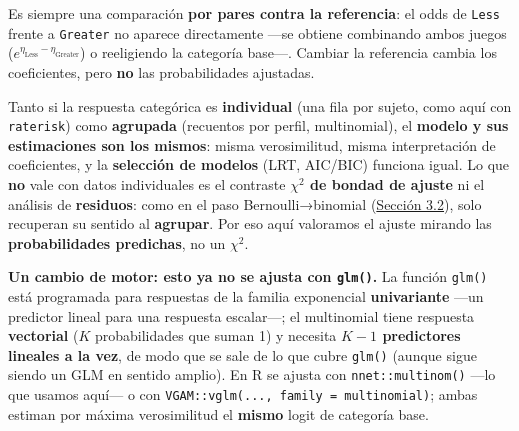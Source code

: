 \documentclass[
  letterpaper,
  DIV=11,
  numbers=noendperiod]{scrartcl}
\begin{document}
Es siempre una comparación \textbf{por pares contra la referencia}: el
odds de \texttt{Less} frente a \texttt{Greater} no aparece directamente
---se obtiene combinando ambos juegos
(\(e^{\eta_{\text{Less}}-\eta_{\text{Greater}}}\)) o reeligiendo la
categoría base---. Cambiar la referencia cambia los coeficientes, pero
\textbf{no} las probabilidades ajustadas.

\begin{tcolorbox}[enhanced jigsaw, breakable, colframe=quarto-callout-note-color-frame, left=2mm, arc=.35mm, colbacktitle=quarto-callout-note-color!10!white, toprule=.15mm, colback=white, coltitle=black, rightrule=.15mm, opacitybacktitle=0.6, title=\textcolor{quarto-callout-note-color}{\faInfo}\hspace{0.5em}{Individual o agrupado: qué cambia y qué no}, titlerule=0mm, toptitle=1mm, bottomtitle=1mm, leftrule=.75mm, bottomrule=.15mm, opacityback=0]

Tanto si la respuesta categórica es \textbf{individual} (una fila por
sujeto, como aquí con \texttt{raterisk}) como \textbf{agrupada}
(recuentos por perfil, multinomial), el \textbf{modelo y sus
estimaciones son los mismos}: misma verosimilitud, misma interpretación
de coeficientes, y la \textbf{selección de modelos} (LRT, AIC/BIC)
funciona igual. Lo que \textbf{no} vale con datos individuales es el
contraste \textbf{\(\chi^2\) de bondad de ajuste} ni el análisis de
\textbf{residuos}: como en el paso Bernoulli→binomial
(\protect\hyperlink{sec-u13-gof-binomial}{Sección 3.2}), solo recuperan
su sentido al \textbf{agrupar}. Por eso aquí valoramos el ajuste mirando
las \textbf{probabilidades predichas}, no un \(\chi^2\).

\end{tcolorbox}

\textbf{Un cambio de motor: esto ya no se ajusta con \texttt{glm()}.} La
función \texttt{glm()} está programada para respuestas de la familia
exponencial \textbf{univariante} ---un predictor lineal para una
respuesta escalar---; el multinomial tiene respuesta \textbf{vectorial}
(\(K\) probabilidades que suman 1) y necesita \textbf{\(K-1\)
predictores lineales a la vez}, de modo que se sale de lo que cubre
\texttt{glm()} (aunque sigue siendo un GLM en sentido amplio). En R se
ajusta con \texttt{nnet::multinom()} ---lo que usamos aquí--- o con
\texttt{VGAM::vglm(...,\ family\ =\ multinomial)}; ambas estiman por
máxima verosimilitud el \textbf{mismo} logit de categoría base.
\end{document}
